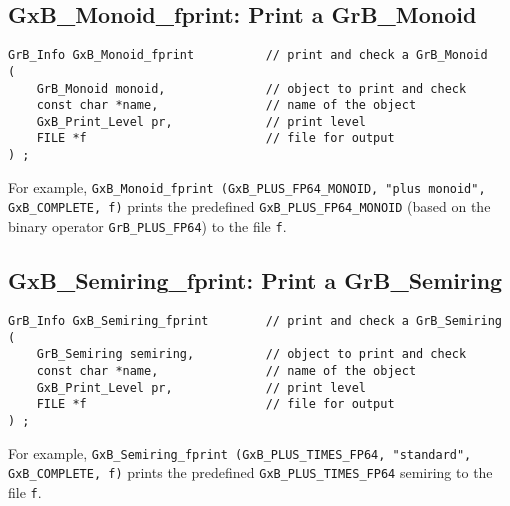 \documentclass[12pt]{article}
\begin{document}
\newpage
\subsection{{\sf GxB\_Monoid\_fprint:} Print a {\sf GrB\_Monoid}}

\begin{mdframed}[userdefinedwidth=6in]
{\footnotesize
\begin{verbatim}
GrB_Info GxB_Monoid_fprint          // print and check a GrB_Monoid
(
    GrB_Monoid monoid,              // object to print and check
    const char *name,               // name of the object
    GxB_Print_Level pr,             // print level
    FILE *f                         // file for output
) ;
\end{verbatim} } \end{mdframed}

For example,
\verb'GxB_Monoid_fprint (GxB_PLUS_FP64_MONOID, "plus monoid",'
\verb'GxB_COMPLETE, f)'
prints the predefined \verb'GxB_PLUS_FP64_MONOID' (based on the binary
operator \verb'GrB_PLUS_FP64') to the file \verb'f'.

\subsection{{\sf GxB\_Semiring\_fprint:} Print a {\sf GrB\_Semiring}}

\begin{mdframed}[userdefinedwidth=6in]
{\footnotesize
\begin{verbatim}
GrB_Info GxB_Semiring_fprint        // print and check a GrB_Semiring
(
    GrB_Semiring semiring,          // object to print and check
    const char *name,               // name of the object
    GxB_Print_Level pr,             // print level
    FILE *f                         // file for output
) ;
\end{verbatim} } \end{mdframed}

For example,
\verb'GxB_Semiring_fprint (GxB_PLUS_TIMES_FP64, "standard",'
\verb'GxB_COMPLETE, f)'
prints the predefined \verb'GxB_PLUS_TIMES_FP64' semiring to the file \verb'f'.

\end{document}
